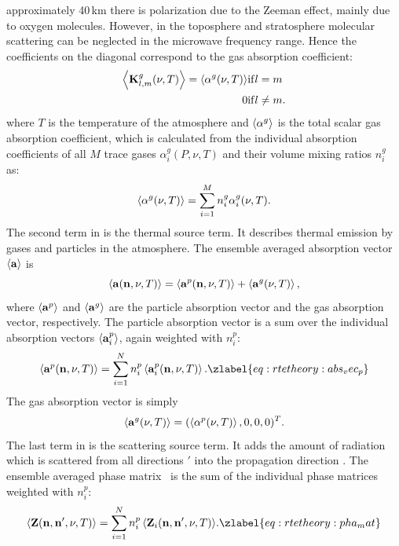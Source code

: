 approximately 40\,km there is polarization due to the Zeeman effect,
mainly due to oxygen molecules.  However, in the toposphere and
stratosphere molecular scattering can be neglected in the microwave
frequency range. Hence the coefficients on the diagonal correspond to
the gas absorption coefficient:
\begin{eqnarray}
\left\langle {\bf K}^{g}_{l,m}(\nu, T) \right\rangle =
\left\langle \alpha^g(\nu, T) \right\rangle & \mathrm{if } l = m \\
0 & \mathrm{if } l \neq m.
\end{eqnarray}
where $T$ is the temperature of the atmosphere and $\left\langle  \alpha^g
 \right\rangle$ is the total scalar gas absorption coefficient, which is
calculated from the individual absorption coefficients of all $M$
trace gases $\alpha_i^g(P, \nu, T)$ and their volume mixing ratios
$n^g_i$ as:
\begin{equation}
   \left\langle  \alpha^g(\nu, T)  \right\rangle =  \sum_{i=1}^M  n^g_i \alpha_i^g(\nu, T).
\end{equation}
The second term in  is the thermal source term. It
describes thermal emission by gases and particles in the atmosphere.
The ensemble averaged absorption vector $\left\langle {\bf a} \right\rangle$ is
\begin{equation}
  \left\langle {\bf a} ({\bf n}, \nu, T) \right\rangle  =
  \left\langle {\bf a}^{p} ({\bf n}, \nu, T) \right\rangle +
  \left\langle  {\bf a}^{g} (\nu, T)  \right\rangle,
\end{equation}
where $\left\langle {\bf a}^{p} \right\rangle$ and $\left\langle  {\bf a}^{g}  \right\rangle$
are the particle absorption vector and the gas absorption vector,
respectively.  The particle absorption vector is a sum over the
individual absorption vectors $\left\langle  {\bf a}_i^p  \right\rangle $, again
weighted with $n^p_i$:
\begin{equation}
  \EnsAvr{\AbsVec^{p}(\PDir, \nu, T)} = \sum_{i=1}^N n^p_i \EnsAvr{\AbsVec_i^p (\PDir, \nu, T)}.
\zlabel{eq:rtetheory:abs_vec_p}
\end{equation}
The gas absorption vector is simply
\begin{equation}
 \left\langle  {\bf a}^{g}(\nu, T)  \right\rangle  = (\left\langle \alpha^p(\nu, T) \right\rangle, 0, 0, 0)^T.
\end{equation}
The last term in  is the scattering source term.
It adds the amount of radiation which is scattered from all directions
\PDir$'$ into the propagation direction \PDir.  The ensemble
averaged phase matrix \EnsAvr\PhaMat\ is the sum of the individual
phase matrices  weighted with $n^p_i$:
\begin{equation}
  \EnsAvr{\PhaMat(\PDir, \PDir', \nu, T)} = 
  \sum_{i=1}^N {n^p_i\EnsAvr{\PhaMat_i(\PDir,
    \PDir', \nu, T)}}.
  \zlabel{eq:rtetheory:pha_mat}
\end{equation}

